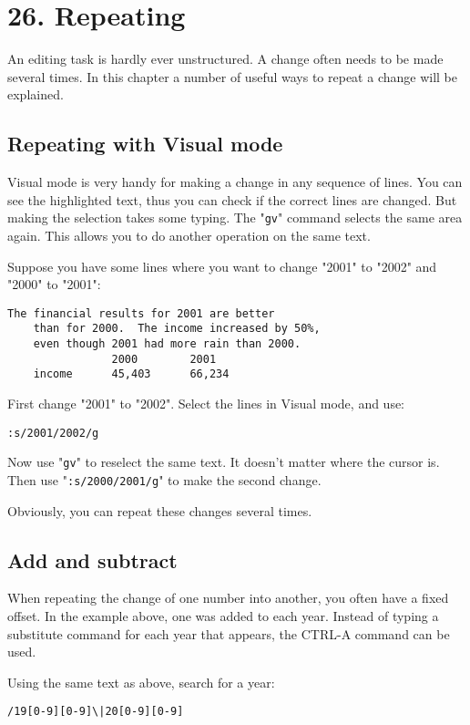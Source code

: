 \section{26. Repeating}
An editing task is hardly ever unstructured.
A change often needs to be made several times.
In this chapter a number of useful ways to repeat a change will be explained.
\subsection{Repeating with Visual mode}
Visual mode is very handy for making a change in any sequence of lines.
You can see the highlighted text, thus you can check if the correct lines are changed.
But making the selection takes some typing.
The "\texttt{gv}" command selects the same area again.
This allows you to do another operation on the same text.

Suppose you have some lines where you want to change "2001" to "2002" and "2000" to "2001":

\begin{Verbatim}[samepage=true]
    The financial results for 2001 are better 
    than for 2000.  The income increased by 50%, 
    even though 2001 had more rain than 2000. 
                2000        2001 
    income      45,403      66,234 
\end{Verbatim}

First change "2001" to "2002".  Select the lines in Visual mode, and use:

\begin{Verbatim}[samepage=true]
 :s/2001/2002/g
\end{Verbatim}

Now use "\texttt{gv}" to reselect the same text.
It doesn't matter where the cursor is.
Then use "\verb!:s/2000/2001/g!" to make the second change.

Obviously, you can repeat these changes several times.
\subsection{Add and subtract}
When repeating the change of one number into another, you often have a fixed offset.
In the example above, one was added to each year.
Instead of typing a substitute command for each year that appears, the CTRL-A command can be used.

Using the same text as above, search for a year:

\begin{Verbatim}[samepage=true]
 /19[0-9][0-9]\|20[0-9][0-9]
\end{Verbatim}

